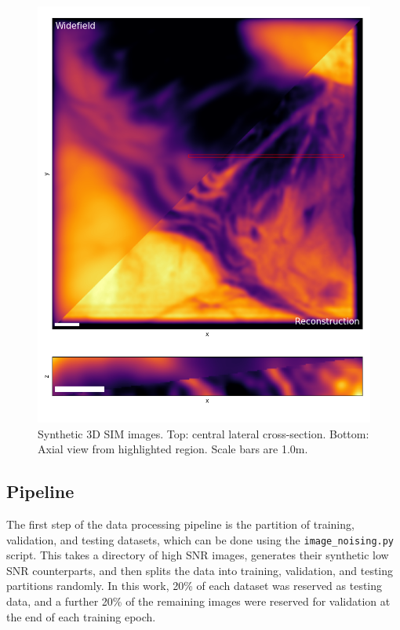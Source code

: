 \documentclass[12pt]{article}
\begin{document}
\begin{figure}[hbtp]
    \includegraphics[scale=0.8, center]{figures/3DSIM_recon.png}
    \caption{Synthetic 3D SIM images. Top: central lateral cross-section. Bottom: Axial view from highlighted region. Scale bars are 1.0\textmu m.}
    \label{fig:3D_SIM}
\end{figure}

\subsection{Pipeline}

The first step of the data processing pipeline is the partition of training, validation, and testing datasets,
which can be done using the \texttt{image\_noising.py} script.
This takes a directory of high SNR images, generates their synthetic low SNR counterparts,
and then splits the data into training, validation, and testing partitions randomly.
In this work, 20\% of each dataset was reserved as testing data,
and a further 20\% of the remaining images were reserved for validation at the end of each training epoch.
\end{document}
